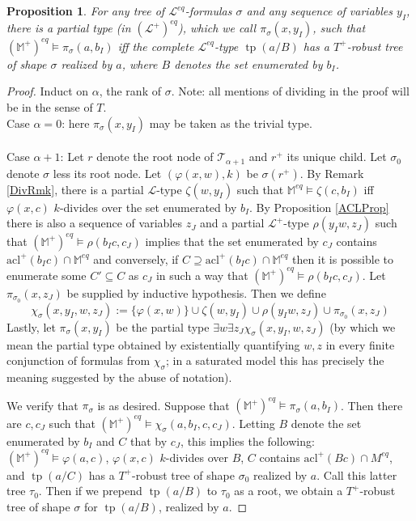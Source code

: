 \documentclass{article}
\DeclareMathOperator{\tp}{tp}
\newtheorem{prop}[theorem]{Proposition}
\theoremstyle{remark}
\theoremstyle{definition}
\begin{document}
\begin{prop}\label{TypeDefProp}
    For any tree of $\mathcal{L}^{eq}$-formulas $\sigma$ and any sequence of variables $y_I$, there is a partial type (in $(\mathcal{L}^+)^{eq}$), which we call $\pi_\sigma(x, y_I)$, such that $(\mathbb{M}^+)^{eq}\models \pi_\sigma(a, b_I)$ iff the complete $\mathcal{L}^{eq}$-type $\tp(a/B)$ has a $T^+$-robust tree of shape $\sigma$ realized by $a$, where $B$ denotes the set enumerated by $b_I$.
\end{prop}
\begin{proof}
    Induct on $\alpha$, the rank of $\sigma$. Note: all mentions of dividing in the proof will be in the sense of $T$.\\
    
    \noindent Case $\alpha=0$: here $\pi_\sigma(x,y_I)$ may be taken as the trivial type.\\
    \\
    \noindent Case $\alpha+1$: Let $r$ denote the root node of $\mathcal{T}_{\alpha+1}$ and $r^+$ its unique child. Let $\sigma_0$ denote $\sigma$ less its root node. Let $(\varphi(x,w),k)$ be $\sigma(r^+)$. By Remark \ref{DivRmk}, there is a partial $\mathcal{L}$-type $\zeta(w, y_I)$ such that $\mathbb{M}^{eq}\models\zeta(c,b_I)$ iff $\varphi(x,c)$ $k$-divides over the set enumerated by $b_I$. By Proposition \ref{ACLProp} there is also a sequence of variables $z_J$ and a partial $\mathcal{L}^+$-type $\rho(y_Iw,z_J)$ such that $(\mathbb{M}^+)^{eq}\models \rho(b_Ic,c_J)$ implies that the set enumerated by $c_J$ contains $\mathrm{acl}^+(b_Ic)\cap\mathbb{M}^{eq}$ and conversely, if $C\supseteq \mathrm{acl}^+(b_Ic)\cap\mathbb{M}^{eq}$ then it is possible to enumerate some $C'\subseteq C$ as $c_J$ in such a way that $(\mathbb{M}^+)^{eq}\models \rho(b_Ic,c_J)$. Let $\pi_{\sigma_0}(x, z_J)$ be supplied by inductive hypothesis. Then we define 
    \[\chi_{\sigma}(x,y_I,w,z_J):=\{\varphi(x,w)\}\cup \zeta(w, y_I)\cup \rho(y_Iw,z_J)\cup \pi_{\sigma_0}(x,z_J)\]
    Lastly, let $\pi_\sigma(x,y_I)$ be the partial type $\exists w\exists z_J\chi_{\sigma}(x,y_I,w,z_J)$ (by which we mean the partial type obtained by existentially quantifying $w,z$ in every finite conjunction of formulas from $\chi_\sigma$; in a saturated model this has precisely the meaning suggested by the abuse of notation).
    
    We verify that $\pi_\sigma$ is as desired. Suppose that $(\mathbb{M}^+)^{eq}\models \pi_\sigma(a,b_I)$. Then there are $c,c_J$ such that $(\mathbb{M}^+)^{eq}\models\chi_\sigma(a,b_I,c,c_J)$. Letting $B$ denote the set enumerated by $b_I$ and $C$ that by $c_J$, this implies the following: $(\mathbb{M}^+)^{eq}\models\varphi(a,c)$, $\varphi(x,c)$ $k$-divides over $B$, $C$ contains $\mathrm{acl}^+(Bc)\cap \mathbb{}M^{eq}$, and $\tp(a/C)$ has a $T^+$-robust tree of shape $\sigma_0$ realized by $a$. Call this latter tree $\tau_0$. Then if we prepend $\tp(a/B)$ to $\tau_0$ as a root, we obtain a $T^+$-robust tree of shape $\sigma$ for $\tp(a/B)$, realized by $a$.


\end{proof}
\end{document}
